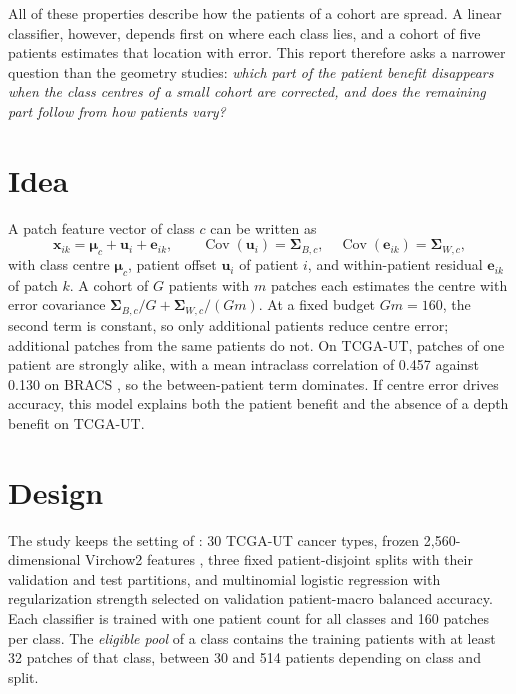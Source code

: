 \documentclass[11pt]{article}
\begin{document}
All of these properties describe how the patients of a cohort are spread. A linear classifier, however, depends first on where each class lies, and a cohort of five patients estimates that location with error. This report therefore asks a narrower question than the geometry studies: \emph{which part of the patient benefit disappears when the class centres of a small cohort are corrected, and does the remaining part follow from how patients vary?}

\section{Idea}
\label{sec:idea}
A patch feature vector of class $c$ can be written as
\begin{equation}
  \mathbf x_{ik}=\boldsymbol\mu_c+\mathbf u_i+\mathbf e_{ik},\qquad
  \operatorname{Cov}(\mathbf u_i)=\boldsymbol\Sigma_{B,c},\quad
  \operatorname{Cov}(\mathbf e_{ik})=\boldsymbol\Sigma_{W,c},
  \label{eq:model}
\end{equation}
\noindent with class centre $\boldsymbol\mu_c$, patient offset $\mathbf u_i$ of patient $i$, and within-patient residual $\mathbf e_{ik}$ of patch $k$. A cohort of $G$ patients with $m$ patches each estimates the centre with error covariance $\boldsymbol\Sigma_{B,c}/G+\boldsymbol\Sigma_{W,c}/(Gm)$. At a fixed budget $Gm=160$, the second term is constant, so only additional patients reduce centre error; additional patches from the same patients do not. On TCGA-UT, patches of one patient are strongly alike, with a mean intraclass correlation of 0.457 against 0.130 on BRACS \citep{queisler2026effectiveSupport}, so the between-patient term dominates. If centre error drives accuracy, this model explains both the patient benefit and the absence of a depth benefit on TCGA-UT.

\section{Design}
\label{sec:design}
The study keeps the setting of \citet{queisler2026hullCoverage}: 30 TCGA-UT cancer types, frozen 2,560-dimensional Virchow2 features \citep{zimmermann2024virchow2}, three fixed patient-disjoint splits with their validation and test partitions, and multinomial logistic regression with regularization strength selected on validation patient-macro balanced accuracy. Each classifier is trained with one patient count for all classes and 160 patches per class. The \emph{eligible pool} of a class contains the training patients with at least 32 patches of that class, between 30 and 514 patients depending on class and split.
\end{document}
